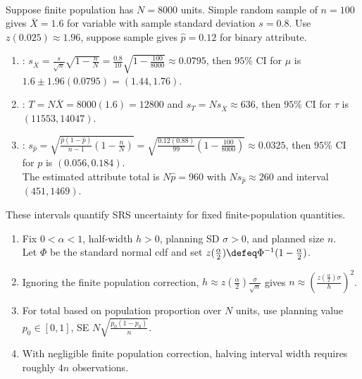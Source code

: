 \begin{example} \label{ex:srs-generic-confidence-intervals} \\
Suppose finite population has $N=8000$ units. Simple random sample of $n=100$ gives $\overline{X}=1.6$ for variable with sample standard deviation $s=0.8$. Use $z(0.025)\approx1.96$, suppose sample gives $\widehat p=0.12$ for binary attribute.
\begin{enumerate}[label=(\roman*)]
\setlength{\itemsep}{0pt}
\item {}: $s_{\overline{X}}=\frac{s}{\sqrt n}\sqrt{1-\frac{n}{N}}=\frac{0.8}{10}\sqrt{1-\frac{100}{8000}}\approx0.0795$, then $95\%$ CI for $\mu$ is $1.6\pm1.96(0.0795)=(1.44,1.76)$.
\item {}: $T=N\overline{X}=8000(1.6)=12800$ and $s_T=Ns_{\overline{X}}\approx636$, then $95\%$ CI for $\tau$ is $(11553,14047)$.
\item {}: $s_{\widehat p}=\sqrt{\frac{\widehat p(1-\widehat p)}{n-1}\left(1-\frac{n}{N}\right)}=\sqrt{\frac{0.12(0.88)}{99}\left(1-\frac{100}{8000}\right)}\approx0.0325$, then $95\%$ CI for $p$ is $(0.056,0.184)$.\\
The estimated attribute total is $N\widehat p=960$ with $Ns_{\widehat p}\approx260$ and interval $(451,1469)$.
\end{enumerate}
These intervals quantify SRS uncertainty for fixed finite-population quantities.
\end{example}

\begin{method} \label{meth:srs-sample-size-from-half-width} 
\begin{enumerate}[label=(\roman*)]
\setlength{\itemsep}{0pt}
\item Fix $0<\alpha<1$, half-width $h>0$, planning SD $\sigma>0$, and planned size $n$.\\
Let $\Phi$ be the standard normal cdf and set $z(\frac{\alpha}{2})\defeq\Phi^{-1}(1-\frac{\alpha}{2})$.
\item Ignoring the finite population correction, $h\approx z(\frac{\alpha}{2})\frac{\sigma}{\sqrt n}$ gives $n\approx\left(\frac{z(\frac{\alpha}{2})\sigma}{h}\right)^2$.
\item For total based on population proportion over $N$ units, use planning value $p_0\in[0,1]$, SE $N\sqrt{\frac{p_0(1-p_0)}{n}}$.
\item With negligible finite population correction, halving interval width requires roughly $4n$ observations.
\end{enumerate}
\end{method}
